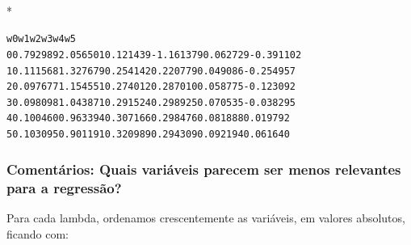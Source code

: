 \documentclass[letterpaper,10pt,english]{/usr/local/lib/python2.7/dist-packages/sphinx/texinputs/sphinxhowto}
\def\smaller{\fontsize{9.5pt}{9.5pt}\selectfont}
\newenvironment{InvisibleVerbatim}
        {\begin{mdframed}[leftmargin=0.1\linewidth,innerleftmargin=3pt,innerrightmargin=3pt, userdefinedwidth=1\linewidth, linewidth=0pt, linecolor=white, usetwoside=false]}
        {\end{mdframed}}
\begin{document}
        

            
                \makebox[0.1\linewidth]{\smaller\hfill\tt\color{nbframe-out-prompt}Out\hspace{4pt}{[}198{]}:\hspace{4pt}}\\*
                \vspace{-2.55\baselineskip}\begin{InvisibleVerbatim}
                \vspace{-0.5\baselineskip}
\begin{alltt}         w0        w1        w2        w3        w4        w5
0  0.792989  2.056501  0.121439 -1.161379  0.062729 -0.391102
1  0.111568  1.327679  0.254142  0.220779  0.049086 -0.254957
2  0.097677  1.154551  0.274012  0.287010  0.058775 -0.123092
3  0.098098  1.043871  0.291524  0.298925  0.070535 -0.038295
4  0.100460  0.963394  0.307166  0.298476  0.081888  0.019792
5  0.103095  0.901191  0.320989  0.294309  0.092194  0.061640\end{alltt}

            \end{InvisibleVerbatim}
            
        
    
\subsubsection{Comentários: Quais variáveis parecem ser menos relevantes para a
regressão?}
Para cada lambda, ordenamos crescentemente as variáveis, em valores
absolutos, ficando com:


\end{document}
